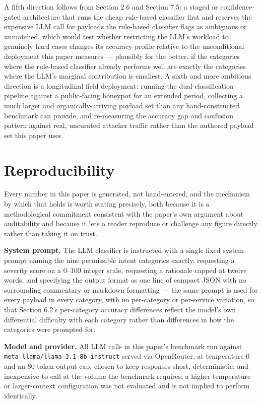 \documentclass[journal,10pt,twocolumn]{IEEEtran}
\begin{document}
A fifth direction follows from Section 2.6 and Section 7.5: a staged or confidence-gated architecture that runs the cheap rule-based classifier first and reserves the expensive LLM call for payloads the rule-based classifier flags as ambiguous or unmatched, which would test whether restricting the LLM's workload to genuinely hard cases changes its accuracy profile relative to the unconditional deployment this paper measures --- plausibly for the better, if the categories where the rule-based classifier already performs well are exactly the categories where the LLM's marginal contribution is smallest. A sixth and more ambitious direction is a longitudinal field deployment: running the dual-classification pipeline against a public-facing honeypot for an extended period, collecting a much larger and organically-arriving payload set than any hand-constructed benchmark can provide, and re-measuring the accuracy gap and confusion pattern against real, uncurated attacker traffic rather than the authored payload set this paper uses.

\section{Reproducibility}

Every number in this paper is generated, not hand-entered, and the mechanism by which that holds is worth stating precisely, both because it is a methodological commitment consistent with the paper's own argument about auditability and because it lets a reader reproduce or challenge any figure directly rather than taking it on trust.

\textbf{System prompt.} The LLM classifier is instructed with a single fixed system prompt naming the nine permissible intent categories exactly, requesting a severity score on a 0--100 integer scale, requesting a rationale capped at twelve words, and specifying the output format as one line of compact JSON with no surrounding commentary or markdown formatting --- the same prompt is used for every payload in every category, with no per-category or per-service variation, so that Section 6.2's per-category accuracy differences reflect the model's own differential difficulty with each category rather than differences in how the categories were prompted for.

\textbf{Model and provider.} All LLM calls in this paper's benchmark run against \texttt{meta-llama/llama-3.1-8b-instruct} served via OpenRouter, at temperature 0 and an 80-token output cap, chosen to keep responses short, deterministic, and inexpensive to call at the volume the benchmark requires; a higher-temperature or larger-context configuration was not evaluated and is not implied to perform identically.
\end{document}
